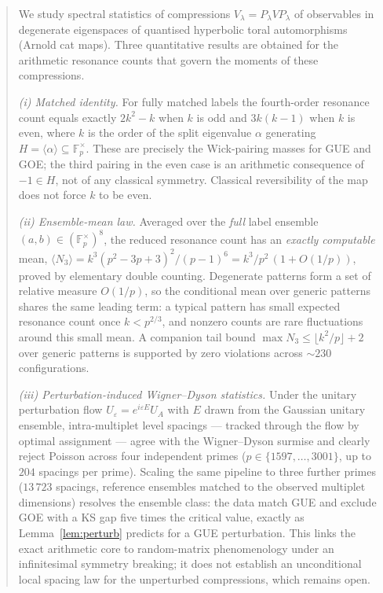 \documentclass[11pt]{article}
\begin{document}
\begin{abstract}
We study spectral statistics of compressions $V_\lambda=P_\lambda V P_\lambda$
of observables in degenerate eigenspaces of quantised hyperbolic toral
automorphisms (Arnold cat maps). Three quantitative results are obtained
for the arithmetic resonance counts that govern the moments of these
compressions.

\emph{(i) Matched identity.} For fully matched labels the fourth-order
resonance count equals exactly $2k^2-k$ when $k$ is odd and $3k(k-1)$
when $k$ is even, where $k$ is the order of the split eigenvalue
$\alpha$ generating $H=\langle\alpha\rangle\subseteq\mathbb F_p^\times$.
These are precisely the Wick-pairing masses for GUE and GOE; the third
pairing in the even case is an arithmetic consequence of
$-1\in H$, not of any classical symmetry. Classical reversibility of
the map does not force $k$ to be even.

\emph{(ii) Ensemble-mean law.} Averaged over the \emph{full} label
ensemble $(a,b)\in(\mathbb F_p^\times)^8$, the reduced resonance count
has an \emph{exactly computable} mean,
$\langle N_3\rangle=k^3(p^2-3p+3)^2/(p-1)^6=k^3/p^2\,(1+O(1/p))$,
proved by elementary double counting. Degenerate patterns form a set
of relative measure $O(1/p)$, so the conditional mean over generic
patterns shares the same leading term: a typical pattern has small
expected resonance count once $k<p^{2/3}$, and nonzero counts are rare
fluctuations around this small mean. A companion tail bound
$\max N_3\le\lfloor k^2/p\rfloor+2$ over generic patterns is supported
by zero violations across ${\sim}230$ configurations.

\emph{(iii) Perturbation-induced Wigner--Dyson statistics.} Under the
unitary perturbation flow $U_\varepsilon=e^{i\varepsilon E}U_A$ with
$E$ drawn from the Gaussian unitary ensemble, intra-multiplet level
spacings --- tracked through the flow by optimal assignment ---
agree with the Wigner--Dyson surmise and clearly reject Poisson across
four independent primes ($p\in\{1597,\dots,3001\}$, up to $204$
spacings per prime). Scaling the same pipeline to three further
primes ($13\,723$ spacings, reference ensembles matched to the
observed multiplet dimensions) resolves the ensemble class: the data
match GUE and exclude GOE with a KS gap five times the critical
value, exactly as Lemma~\ref{lem:perturb} predicts for a GUE
perturbation. This
links the exact arithmetic core to random-matrix phenomenology under
an infinitesimal symmetry breaking; it does not establish an
unconditional local spacing law for the unperturbed compressions,
which remains open.
\end{abstract}
\end{document}
